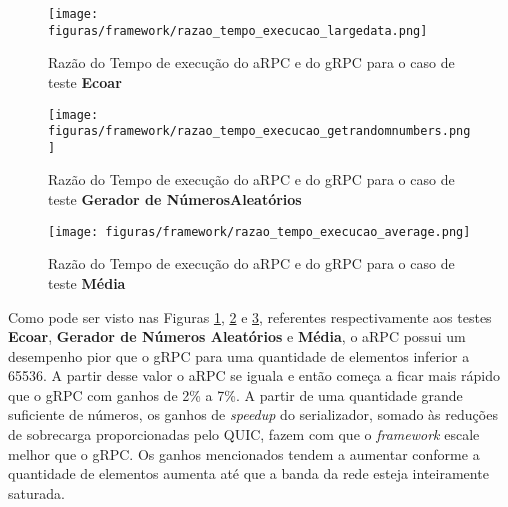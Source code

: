\begin{figure}[!ht]
    \centering
    \caption{Razão do Tempo de execução do aRPC e do gRPC para o caso de teste \textbf{Ecoar}}
    \texttt{[image: figuras/framework/razao\_tempo\_execucao\_largedata.png]}
    \label{fig:razao_tempo_execucao_largedata}
\end{figure}

\begin{figure}[!ht]
    \centering
    \caption{Razão do Tempo de execução do aRPC e do gRPC para o caso de teste \textbf{Gerador de NúmerosAleatórios}}
    \texttt{[image: figuras/framework/razao\_tempo\_execucao\_getrandomnumbers.png]}
    \label{fig:razao_tempo_execucao_getrandomnumbers}
\end{figure}

\begin{figure}[ht]
    \centering
    \caption{Razão do Tempo de execução do aRPC e do gRPC para o caso de teste \textbf{Média}}
    \texttt{[image: figuras/framework/razao\_tempo\_execucao\_average.png]}
    \label{fig:razao_tempo_execucao_average}
\end{figure}

Como pode ser visto nas Figuras \ref{fig:razao_tempo_execucao_largedata}, \ref{fig:razao_tempo_execucao_getrandomnumbers} e \ref{fig:razao_tempo_execucao_average}, referentes respectivamente aos testes \textbf{Ecoar}, \textbf{Gerador de Números Aleatórios} e \textbf{Média}, o aRPC possui um desempenho pior que o gRPC para uma quantidade de elementos inferior a 65536. A partir desse valor o aRPC se iguala e então começa a ficar mais rápido que o gRPC com ganhos de 2\% a 7\%. A partir de uma quantidade grande suficiente de números, os ganhos de \textit{speedup} do serializador, somado às reduções de sobrecarga proporcionadas pelo QUIC, fazem com que o \textit{framework} escale melhor que o gRPC. Os ganhos mencionados tendem a aumentar conforme a quantidade de elementos aumenta até que a banda da rede esteja inteiramente saturada.


